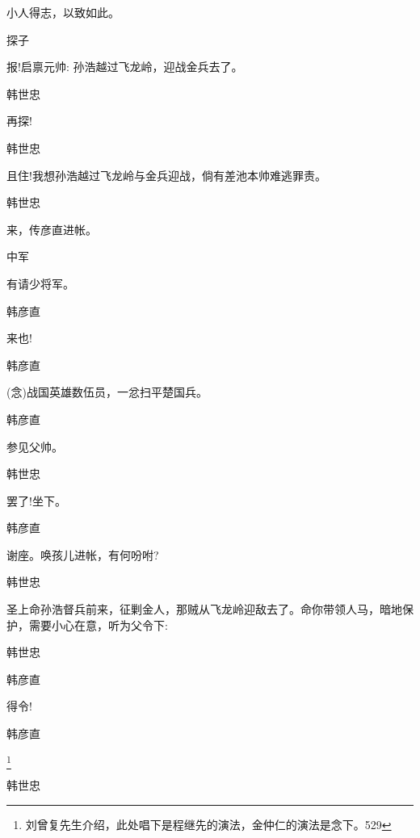 {{{{小人得志，以致如此。}

{探子\hspace{30pt}~

报!启禀元帅: 孙浩越过飞龙岭，迎战金兵去了。}

{韩世忠\hspace{20pt}~

再探!}

{韩世忠

且住!我想孙浩越过飞龙岭与金兵迎战，倘有差池本帅难逃罪责。}

{韩世忠\hspace{20pt}~

来，传彦直进帐。}

{中军\hspace{30pt}~

有请少将军。}

{韩彦直\hspace{20pt}~

来也!}

{韩彦直\hspace{20pt}~

({\akai 念})战国英雄数伍员，一忿扫平楚国兵。}

{韩彦直\hspace{20pt}~

参见父帅。}

{韩世忠\hspace{20pt}~

罢了!坐下。}

{韩彦直\hspace{20pt}~

谢座。唤孩儿进帐，有何吩咐?}

{韩世忠

圣上命孙浩督兵前来，征剿金人，那贼从飞龙岭迎敌去了。命你带领人马，暗地保护，需要小心在意，听为父令下: }

{韩世忠

 }

{韩彦直\hspace{20pt}~

得令!}

{韩彦直

\footnote{ 刘曾复先生介绍，此处唱下是程继先的演法，金仲仁的演法是念下。{529}} }

{韩世忠\hspace{20pt}~

}}}}

